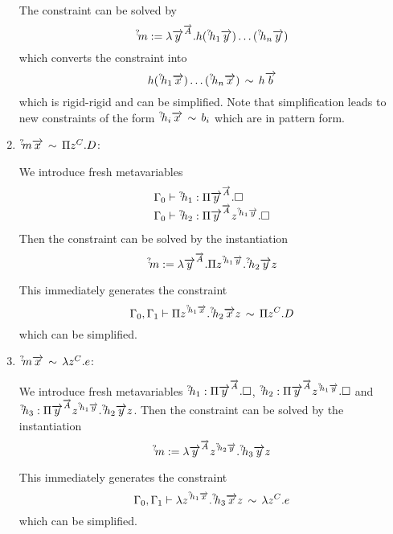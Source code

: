 \begin{enumerate}
        The constraint can be solved by
        $$
            {{}^? \kern-0.2em m} :=
            \lambda {\overrightarrow {y}}^{{\overrightarrow {A}}} .
            h ({{}^? \kern-0.2em h}_1 {\overrightarrow {y}}) \ldots ({{}^? \kern-0.2em h}_n {\overrightarrow {y}})
        $$
        which converts the constraint into
        $$
            h ({{}^? \kern-0.2em h}_1 {\overrightarrow {x}}) \ldots ({{}^? \kern-0.2em h}_n {\overrightarrow {x}})
            \,\sim\,
            h {\overrightarrow {b}}
        $$
        which is rigid-rigid and can be simplified. Note that simplification
        leads to new constraints of the form ${{}^? \kern-0.2em h}_i {\overrightarrow {x}} \,\sim\, b_i$ which
        are in pattern form.

    \item ${{}^? \kern-0.2em m} {\overrightarrow {x}} \,\sim\, \Pi z^C. D$:

        We introduce fresh metavariables
        $$
            \begin{array}{lllll} 
                \Gamma_0
                \vdash
                {{}^? \kern-0.2em h}_1: \Pi {\overrightarrow {y}}^{{\overrightarrow {A}}}. {\Box}
                \\
                \Gamma_0
                \vdash
                {{}^? \kern-0.2em h}_2: \Pi {\overrightarrow {y}}^{{\overrightarrow {A}}} z^{{{}^? \kern-0.2em h}_1 {\overrightarrow {y}}} . {\Box}
             \end{array}
        $$
        Then the constraint can be solved by the instantiation
        $$
            {{}^? \kern-0.2em m}
            :=
            \lambda {\overrightarrow {y}}^{{\overrightarrow {A}}}
            . \Pi z^{{{}^? \kern-0.2em h}_1 {\overrightarrow {y}}}. {{}^? \kern-0.2em h}_2 {\overrightarrow {y}} z
        $$

        This immediately generates the constraint
        $$
            \Gamma_0, \Gamma_1
            \vdash
            \Pi z^{{{}^? \kern-0.2em h}_1 {\overrightarrow {x}}} . {{}^? \kern-0.2em h}_2 {\overrightarrow {x}} z
            \,\sim\,
            \Pi z^C . D
        $$
        which can be simplified.

    \item ${{}^? \kern-0.2em m} {\overrightarrow {x}} \,\sim\, \lambda z^C. e$:

        We introduce fresh metavariables
        ${{}^? \kern-0.2em h}_1: \Pi {\overrightarrow {y}}^{{\overrightarrow {A}}}. {\Box}$,
        ${{}^? \kern-0.2em h}_2: \Pi {\overrightarrow {y}}^{{\overrightarrow {A}}} z^{{{}^? \kern-0.2em h}_1 {\overrightarrow {y}}} . {\Box}$
        and
        ${{}^? \kern-0.2em h}_3
        : \Pi {\overrightarrow {y}}^{{\overrightarrow {A}}} z^{{{}^? \kern-0.2em h}_1 {\overrightarrow {y}}}
          . {{}^? \kern-0.2em h}_2 {\overrightarrow {y}} z
        $.
        Then the constraint can be solved by the instantiation
        $$
            {{}^? \kern-0.2em m}
            :=
            \lambda {\overrightarrow {y}}^{{\overrightarrow {A}}} z^{{{}^? \kern-0.2em h}_2 {\overrightarrow {y}}}
            . {{}^? \kern-0.2em h}_3 {\overrightarrow {y}} z
        $$

        This immediately generates the constraint
        $$
            \Gamma_0, \Gamma_1
            \vdash
            \lambda z^{{{}^? \kern-0.2em h}_1 {\overrightarrow {x}}} . {{}^? \kern-0.2em h}_3 {\overrightarrow {x}} z
            \,\sim\,
            \lambda z^C . e
        $$
        which can be simplified.
\end{enumerate}




